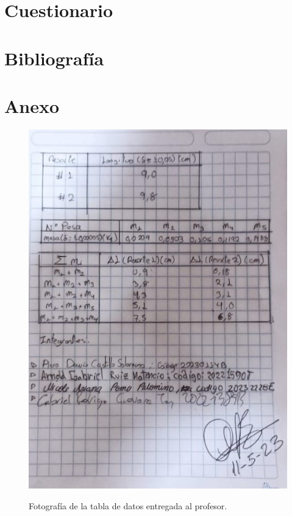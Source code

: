 \documentclass[12pt,a4paper]{article}
\begin{document}
\section{Cuestionario} %

\section{Bibliografía} %
\renewcommand{\bibsection}{}
%

\newpage
\listoffigures
\listoftables
\newpage
\section{Anexo}
\begin{figure}[H]
    \centering
    \includegraphics[width=0.6\linewidth]{images/anexo.jpg}
    \label{ref:anexo}
    \caption{Fotografía de la tabla de datos entregada al profesor.}
\end{figure}
\end{document}
